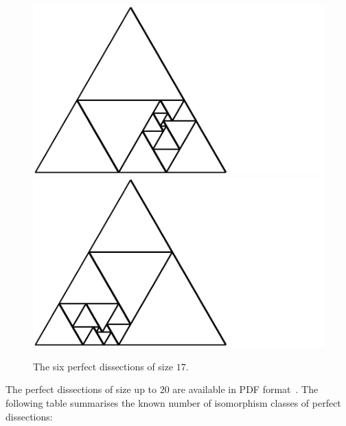 \documentclass[12pt,amstags,fleqn]{article}
\theoremstyle{plain}
\theoremstyle{definition}
\begin{document}
\begin{figure}[htbp]
\begin{center}
\includegraphics{output-dissections-perfect-dissection17_i455488_r2_c5.pdf}\includegraphics{output-dissections-perfect-dissection17_i483193_r2_c6.pdf}
\end{center}
\caption{The six perfect dissections of size $17$.}
\label{figPerfect17}
\end{figure}
%
The perfect dissections of size up to $20$ are available in PDF format~\cite{dissections}.
The following table summarises the known number of isomorphism classes
of perfect dissections:
\end{document}
